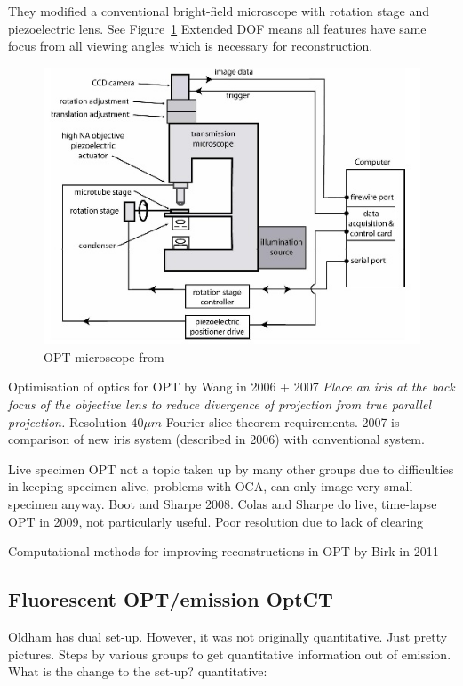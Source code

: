 \documentclass[12pt]{article}
\begin{document}
They modified a conventional bright-field microscope with rotation stage and piezoelectric lens. See Figure~\ref{fig:fauver_setup} Extended DOF means all features have same focus from all viewing angles which is necessary for reconstruction.


\begin{figure}
\centering
\includegraphics[scale=0.8]{Fauver_2005_setup.jpg}
\caption{OPT microscope from \cite{Fauver:2005}}
\label{fig:fauver_setup}
\end{figure}




Optimisation of optics for OPT by Wang in 2006 + 2007 \cite{Wang:2006hy, Wang:2007} 
\textit{Place an iris at the back focus of the objective lens to reduce divergence of projection from true parallel projection.} Resolution $40\mu m$
Fourier slice theorem requirements.
2007 is comparison of new iris system (described in 2006) with conventional system.

Live specimen OPT not a topic taken up by many other groups due to difficulties in keeping specimen alive, problems with OCA, can only image very small specimen anyway. \cite{Boot:2008dt} Boot and Sharpe 2008.
Colas and Sharpe do live, time-lapse OPT in 2009, not particularly useful. Poor resolution due to lack of clearing \cite{Colas:2009}  


Computational methods for improving reconstructions in OPT by Birk in 2011 \cite{Birk:2011}






\subsection{Fluorescent OPT/emission OptCT}
Oldham has dual set-up. However, it was not originally quantitative. Just pretty pictures. Steps by various groups to get quantitative information out of emission. What is the change to the set-up? \cite{Oldham:2006dfa}
quantitative: \cite{Kim:2008eua}
\end{document}
